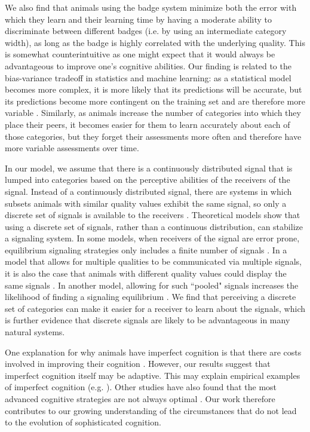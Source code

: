 We also find that animals using the badge system minimize both the error with which they learn and their learning time by having a moderate ability to discriminate between different badges (i.e. by using an intermediate category width), as long as the badge is highly correlated with the underlying quality. This is somewhat counterintuitive as one might expect that it would always be advantageous to improve one's cognitive abilities. Our finding is related to the bias-variance tradeoff in statistics and machine learning: as a statistical model becomes more complex, it is more likely that its predictions will be accurate, but its predictions become more contingent on the training set and are therefore more variable \citep{Domingos:2000cr,Briscoe:2011nx}. Similarly, as animals increase the number of categories into which they place their peers, it becomes easier for them to learn accurately about each of those categories, but they forget their assessments more often and therefore have more variable assessments over time. %

In our model, we assume that there is a continuously distributed signal that is lumped into categories based on the perceptive abilities of the receivers of the signal. Instead of a continuously distributed signal, there are systems in which subsets animals with similar quality values exhibit the same signal, so only a discrete set of signals is available to the receivers \citep{Johnstone:1994uq}. Theoretical models show that using a discrete set of signals, rather than a continuous distribution, can stabilize a signaling system. In some models, when receivers of the signal are error prone, equilibrium signaling strategies only includes a finite number of signals \citep{Grafen:1993kx,Johnstone:1994uq}. In a model that allows for multiple qualities to be communicated via multiple signals, it is also the case that animals with different quality values could display the same signals \citep{Johnstone:1995vn}. In another model, allowing for such ``pooled" signals increases the likelihood of finding a signaling equilibrium \citep{Lachmann:1998fk}. We find that perceiving a discrete set of categories can make it easier for a receiver to learn about the signals, which is further evidence that discrete signals are likely to be advantageous in many natural systems.


One explanation for why animals have imperfect cognition is that there are costs involved in improving their cognition \citep{Dunbar:1992ys,Laughlin:1998ly,Laughlin:2001qf,Gavrilets:2006fk,MacIver:2010ve}. However, our results suggest that imperfect cognition itself may be adaptive. This may explain empirical examples of imperfect cognition (e.g. \citep{Kikuchi:2010ys}).
Other studies have also found that the most advanced cognitive strategies are not always optimal \citep{Stephens:1991fk,Kerr:2003vn,Dunlap:2009vn}. Our work therefore contributes to our growing understanding of the circumstances that do not lead to the evolution of sophisticated cognition.

